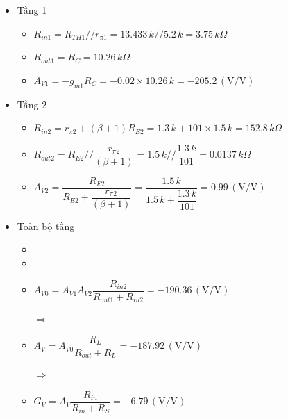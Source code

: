 \begin{itemize}[label=-]
	\item Tầng 1
	\begin{itemize}[label=+, leftmargin=2cm]
		\item \( R_{in1} = R_{TH1} // r_{\pi1} 
		= 13.433\,k // 5.2\,k 
		= 3.75\,k\Omega \)
		
		\item \( R_{out1} = R_C = 10.26\,k\Omega \)
		
		\item \( A_{V1} = -g_{m1} R_C 
		= -0.02 \times 10.26\,k 
		= -205.2\,(\text{V/V}) \)
	\end{itemize}
	
	\item Tầng 2
	\begin{itemize}[label=+, leftmargin=2cm]
		\item \( R_{in2} = r_{\pi2} + (\beta + 1) R_{E2} 
		= 1.3\,k + 101 \times 1.5\,k 
		= 152.8\,k\Omega \)
		
		\item \( R_{out2} = R_{E2} // \dfrac{r_{\pi2}}{(\beta + 1)} 
		= 1.5\,k // \dfrac{1.3\,k}{101} 
		= 0.0137\,k\Omega \)
		
		\item \( A_{V2} = 
		\dfrac{R_{E2}}{R_{E2} + \dfrac{r_{\pi2}}{(\beta + 1)}} 
		= \dfrac{1.5\,k}{1.5\,k + \dfrac{1.3\,k}{101}} 
		= 0.99\,(\text{V/V}) \)
	\end{itemize}
	
	\item Toàn bộ tầng
	\begin{itemize}[label=+, leftmargin=2cm]
		\item {}
		
		\item {}
		
		\item \( A_{V0} = A_{V1} A_{V2} 
		\dfrac{R_{in2}}{R_{out1} + R_{in2}} 
		= -190.36\,(\text{V/V}) \)
		
		$\Rightarrow$ 
		
		\item \( A_V = A_{V0} 
		\dfrac{R_L}{R_{out} + R_L} 
		= -187.92\,(\text{V/V}) \)
		
		$\Rightarrow$ 
		
		\item \( G_V = A_V 
		\dfrac{R_{in}}{R_{in} + R_S} 
		= -6.79\,(\text{V/V}) \)
		

\end{itemize}
\end{itemize}
